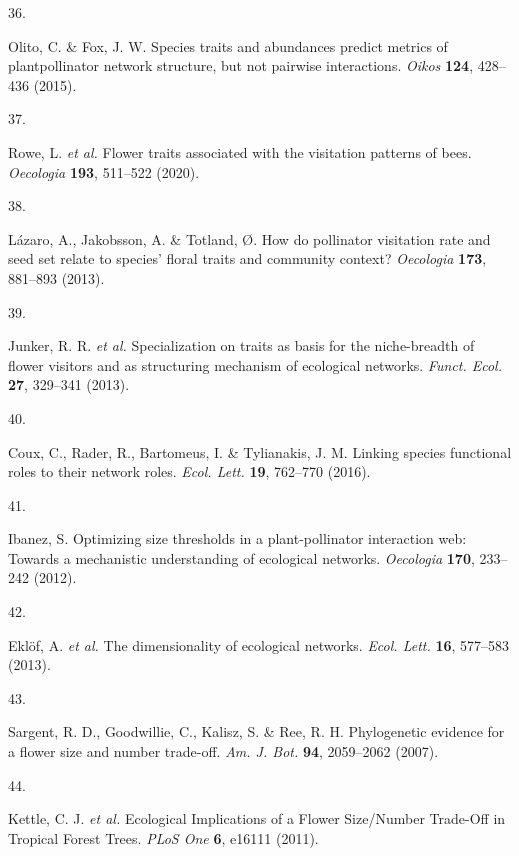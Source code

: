 \documentclass[
  12pt,
  a4paper,
]{article}
\newlength{\cslhangindent}
\newlength{\csllabelwidth}
\newlength{\cslentryspacingunit} %
\newenvironment{CSLReferences}[2] %
 {%
  \setlength{\parindent}{0pt}
  \ifodd #1
  \let\oldpar\par
  \def\par{\hangindent=\cslhangindent\oldpar}
  \fi
  \setlength{\parskip}{#2\cslentryspacingunit}
 }%
 {}
\newcommand{\CSLLeftMargin}[1]{\parbox[t]{\csllabelwidth}{#1}}
\newcommand{\CSLRightInline}[1]{\parbox[t]{\linewidth - \csllabelwidth}{#1}\break}
\begin{document}
\begin{CSLReferences}{0}{0}
\leavevmode{}%
\CSLLeftMargin{36. }
\CSLRightInline{Olito, C. \& Fox, J. W. Species traits and abundances predict metrics of plant\textendash pollinator network structure, but not pairwise interactions. \emph{Oikos} \textbf{124}, 428--436 (2015).}

\leavevmode{}%
\CSLLeftMargin{37. }
\CSLRightInline{Rowe, L. \emph{et al.} Flower traits associated with the visitation patterns of bees. \emph{Oecologia} \textbf{193}, 511--522 (2020).}

\leavevmode{}%
\CSLLeftMargin{38. }
\CSLRightInline{Lázaro, A., Jakobsson, A. \& Totland, Ø. How do pollinator visitation rate and seed set relate to species' floral traits and community context? \emph{Oecologia} \textbf{173}, 881--893 (2013).}

\leavevmode{}%
\CSLLeftMargin{39. }
\CSLRightInline{Junker, R. R. \emph{et al.} Specialization on traits as basis for the niche-breadth of flower visitors and as structuring mechanism of ecological networks. \emph{Funct. Ecol.} \textbf{27}, 329--341 (2013).}

\leavevmode{}%
\CSLLeftMargin{40. }
\CSLRightInline{Coux, C., Rader, R., Bartomeus, I. \& Tylianakis, J. M. Linking species functional roles to their network roles. \emph{Ecol. Lett.} \textbf{19}, 762--770 (2016).}

\leavevmode{}%
\CSLLeftMargin{41. }
\CSLRightInline{Ibanez, S. Optimizing size thresholds in a plant-pollinator interaction web: Towards a mechanistic understanding of ecological networks. \emph{Oecologia} \textbf{170}, 233--242 (2012).}

\leavevmode{}%
\CSLLeftMargin{42. }
\CSLRightInline{Eklöf, A. \emph{et al.} The dimensionality of ecological networks. \emph{Ecol. Lett.} \textbf{16}, 577--583 (2013).}

\leavevmode{}%
\CSLLeftMargin{43. }
\CSLRightInline{Sargent, R. D., Goodwillie, C., Kalisz, S. \& Ree, R. H. Phylogenetic evidence for a flower size and number trade-off. \emph{Am. J. Bot.} \textbf{94}, 2059--2062 (2007).}

\leavevmode{}%
\CSLLeftMargin{44. }
\CSLRightInline{Kettle, C. J. \emph{et al.} Ecological {Implications} of a {Flower Size}/{Number Trade}-{Off} in {Tropical Forest Trees}. \emph{PLoS One} \textbf{6}, e16111 (2011).}


\end{CSLReferences}
\end{document}
